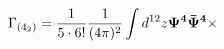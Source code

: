\begin{equation}\label{g4-2}
\Gamma_{(4_{2})}={1\over 5\cdot 6!}{1\over
(4\pi)^{2}}\int d^{12}z {\bf \Psi^{4}\bar{\Psi}^{4}}\times
\end{equation}

